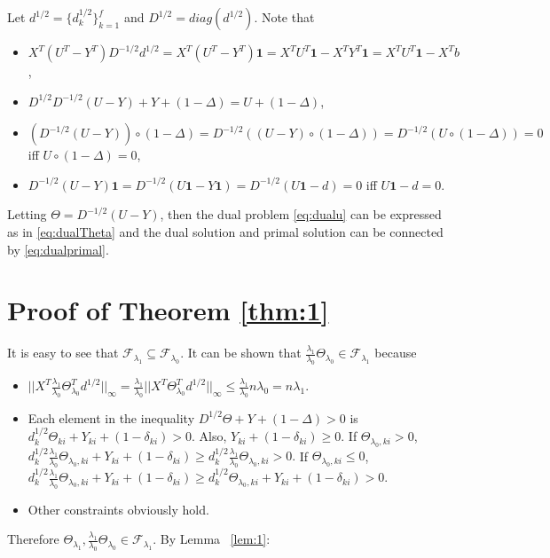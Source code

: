 Let $d^{1/2}=\{d_k^{1/2}\}_{k=1}^f$ and $D^{1/2}=diag(d^{1/2})$. Note that \begin{itemize}
    \item $X^T(U^T-Y^T)D^{-1/2}d^{1/2}=X^T(U^T-Y^T)\mathbf{1}=X^TU^T\mathbf{1}-X^TY^T\mathbf{1}=X^TU^T\mathbf{1}-X^Tb$,
    \item $D^{1/2}D^{-1/2}(U-Y)+Y+(1-\Delta)=U+(1-\Delta)$,
    \item $\left(D^{-1/2}(U-Y)\right)\circ(1-\Delta)=D^{-1/2}\left((U-Y)\circ(1-\Delta)\right)=D^{-1/2}\left(U\circ(1-\Delta)\right)=0$ iff $U\circ(1-\Delta)=0$,
    \item $D^{-1/2}(U-Y)\mathbf{1}=D^{-1/2}(U\mathbf{1}-Y\mathbf{1})=D^{-1/2}(U\mathbf{1}-d)=0$ iff $U\mathbf{1}-d=0$.
\end{itemize}

Letting $\Theta=D^{-1/2}(U-Y)$, then the dual problem \eqref{eq:dualu} can be expressed as in \eqref{eq:dualTheta} and the dual solution and primal solution can be connected by \eqref{eq:dualprimal}.


\section{Proof of Theorem \ref{thm:1}}


It is easy to see that $\mathcal{F}_{\lambda_1}\subseteq\mathcal{F}_{\lambda_0}$. It can be shown that $\frac{\lambda_1}{\lambda_0}\Theta_{\lambda_0}\in\mathcal{F}_{\lambda_1}$ because

\begin{itemize}
    \item $||X^T\frac{\lambda_1}{\lambda_0}\Theta_{\lambda_0}^Td^{1/2}||_\infty=\frac{\lambda_1}{\lambda_0}||X^T\Theta_{\lambda_0}^Td^{1/2}||_\infty\leq \frac{\lambda_1}{\lambda_0}n\lambda_0=n\lambda_1$.
    \item Each element in the inequality $D^{1/2}\Theta+Y+(1-\Delta)> 0$ is $d_k^{1/2}\Theta_{ki}+Y_{ki}+(1-\delta_{ki})>0$. Also, $Y_{ki}+(1-\delta_{ki})\geq 0$. If $\Theta_{\lambda_0,ki}>0$, $d_k^{1/2}\frac{\lambda_1}{\lambda_0}\Theta_{\lambda_0,ki}+Y_{ki}+(1-\delta_{ki})\geq d_k^{1/2}\frac{\lambda_1}{\lambda_0}\Theta_{\lambda_0,ki}>0.$ If $\Theta_{\lambda_0,ki}\leq0$, $d_k^{1/2}\frac{\lambda_1}{\lambda_0}\Theta_{\lambda_0,ki}+Y_{ki}+(1-\delta_{ki})\geq d_k^{1/2}\Theta_{\lambda_0,ki}+Y_{ki}+(1-\delta_{ki})>0.$
    \item Other constraints obviously hold.
\end{itemize}

Therefore $\Theta_{\lambda_1},\frac{\lambda_1}{\lambda_0}\Theta_{\lambda_0}\in \mathcal{F}_{\lambda_1}$. By Lemma ~\ref{lem:1}:

